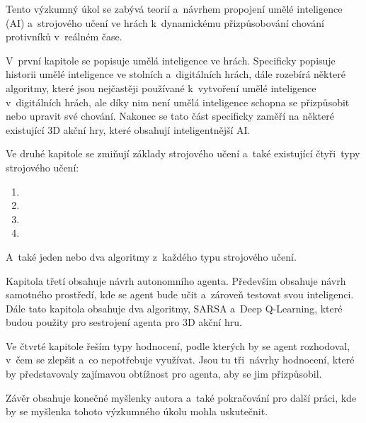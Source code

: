Tento výzkumný úkol se zabývá teorií a~návrhem propojení umělé inteligence (AI) a~strojového učení ve hrách k~dynamickému přizpůsobování chování protivníků v~reálném čase.

V~první kapitole se popisuje umělá inteligence ve hrách. Specificky popisuje historii umělé inteligence ve stolních a~digitálních hrách, dále rozebírá některé algoritmy, které jsou nejčastěji používané k~vytvoření umělé inteligence v~digitálních hrách, ale díky nim není umělá inteligence schopna se přizpůsobit nebo upravit své chování. Nakonec se tato část specificky zaměří na některé existující 3D akční hry, které obsahují inteligentnější AI.

Ve druhé kapitole se zmiňují základy strojového učení a~také existující čtyři~typy strojového učení:
\begin{enumerate}
	\item {}
	\item {}
	\item {}	
	\item {}
\end{enumerate}
A~také jeden nebo dva algoritmy z~každého typu strojového učení.

Kapitola třetí obsahuje návrh autonomního agenta. Především obsahuje návrh samotného prostředí, kde se agent bude učit a~zároveň testovat svou inteligenci. Dále tato kapitola obsahuje dva algoritmy, SARSA a~Deep Q-Learning, které budou použity pro sestrojení agenta pro 3D akční hru.

Ve čtvrté kapitole řeším typy hodnocení, podle kterých by se agent rozhodoval, v~čem se zlepšit a~co nepotřebuje využívat. Jsou tu tři~návrhy hodnocení, které by představovaly zajímavou obtížnost pro agenta, aby se jim přizpůsobil. 

Závěr obsahuje konečné myšlenky autora a~také pokračování pro další práci, kde by se myšlenka tohoto výzkumného úkolu mohla uskutečnit.
